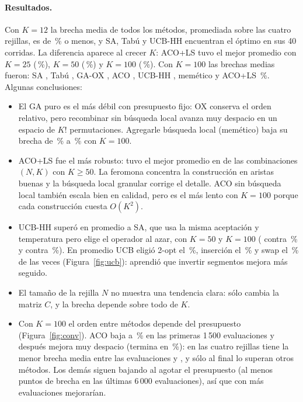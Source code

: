 \documentclass[11pt]{article}
\theoremstyle{remark}
\begin{document}
\paragraph{Resultados.} Con $K=12$ la brecha media de todos los métodos, promediada sobre las cuatro
rejillas, es de \peorGapKBC\,\% o menos, y SA, Tabú y UCB-HH encuentran el óptimo en sus 40 corridas. La diferencia aparece al crecer $K$: ACO+LS tuvo
el mejor promedio con $K=25$ (\gapAcoLsKCF\,\%), $K=50$ (\gapAcoLsKFA\,\%) y $K=100$
(\gapAcoLsKBAA\,\%). Con $K=100$ las brechas medias fueron: SA \gapSaKBAA, Tabú
\gapTabuKBAA, GA-OX \gapGaKBAA, ACO \gapAcoKBAA, UCB-HH \gapUcbKBAA, memético \gapMemKBAA{} y ACO+LS
\gapAcoLsKBAA\,\%. Algunas conclusiones:
\begin{itemize}
\item El GA puro es el más débil con presupuesto fijo: OX conserva el orden relativo, pero recombinar
sin búsqueda local avanza muy despacio en un espacio de $K!$ permutaciones. Agregarle búsqueda local
(memético) baja su brecha de \gapGaKBAA\,\% a \gapMemKBAA\,\% con $K=100$.
\item ACO+LS fue el más robusto: tuvo el mejor promedio en \acoLsMejores{} de las \acoLsCombos{}
combinaciones $(N,K)$ con $K\ge50$. La feromona concentra la construcción en aristas
buenas y la búsqueda local granular corrige el detalle. ACO sin búsqueda local también escala bien
en calidad, pero es el más lento con $K=100$ porque cada construcción cuesta $O(K^2)$.
\item UCB-HH superó en promedio a SA, que usa la misma aceptación y temperatura pero elige el operador
al azar, con $K=50$ y $K=100$ (\gapUcbKFA{} contra \gapSaKFA\,\% y \gapUcbKBAA{} contra \gapSaKBAA\,\%). En promedio UCB eligió 2-opt el \ucbTwo\,\%, inserción el \ucbIns\,\% y swap el
\ucbSwap\,\% de las veces (Figura~\ref{fig:ucb}): aprendió que invertir segmentos mejora más seguido.
\item El tamaño de la rejilla $N$ no muestra una tendencia clara: sólo cambia la matriz $C$, y la
brecha depende sobre todo de $K$.
\item Con $K=100$ el orden entre métodos depende del presupuesto (Figura~\ref{fig:conv}). ACO baja a
\acoGapTemprano\,\% en las primeras 1\,500 evaluaciones y después mejora muy despacio (termina en
\gapAcoKBAA\,\%): en las cuatro rejillas tiene la menor brecha media entre las evaluaciones
\acoLiderDesde{} y \acoLiderHasta, y sólo al final lo superan otros métodos. Los demás siguen bajando al
agotar el presupuesto (al menos \otrosMejoraFinalMin{} puntos de brecha en las últimas 6\,000
evaluaciones), así que con más evaluaciones mejorarían.
\end{itemize}
\end{document}
